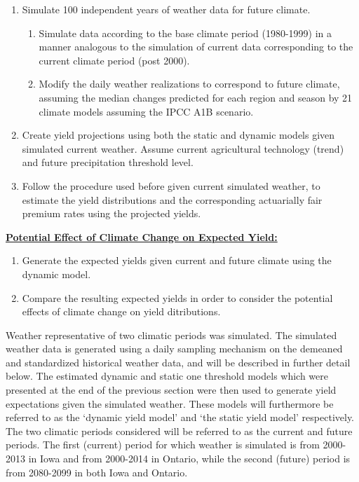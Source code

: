 \begin{enumerate}

    \item Simulate 100 independent years of weather data for future climate.
        \begin{enumerate}
            \item Simulate data according to the base climate period (1980-1999) in a manner analogous to the simulation of current data corresponding to the current climate period (post 2000).
            \item Modify the daily weather realizations to correspond to future climate, assuming the median changes predicted for each region and season by 21 climate models assuming the IPCC A1B scenario.
        \end{enumerate}
    \item Create yield projections using both the static and dynamic models given simulated current weather. Assume current agricultural technology (trend) and future precipitation threshold level.
    \item Follow the procedure used before given current simulated weather, to estimate the yield distributions and the corresponding actuarially fair premium rates using the projected yields.
                
\end{enumerate}
\noindent
\textbf{\underline{ Potential Effect of Climate Change on Expected Yield:}}
\begin{enumerate}
 
    \item Generate the expected yields given current and future climate using the dynamic model. 
    \item Compare the resulting expected yields in order to consider the potential effects of climate change on yield ditributions.
\end{enumerate}

   

Weather representative of two climatic periods was simulated. The simulated weather data is generated using a daily sampling mechanism on the demeaned and standardized historical weather data, and will be described in further detail below. The estimated dynamic and static one threshold models which were presented at the end of the previous section were then used to generate yield expectations given the simulated weather. These models will furthermore be referred to as the ‘dynamic yield model’ and ‘the static yield model’ respectively. The two climatic periods considered will be referred to as the current and future periods. The first (current) period for which weather is simulated is from 2000-2013 in Iowa and from 2000-2014 in Ontario, while the second (future) period is from 2080-2099 in both Iowa and Ontario.  

